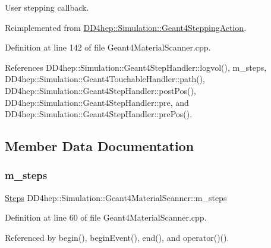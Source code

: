 User stepping callback. 



Reimplemented from \hyperlink{class_d_d4hep_1_1_simulation_1_1_geant4_stepping_action_ab6b61f6eaed6d06ddb3a7ed319258317}{D\+D4hep\+::\+Simulation\+::\+Geant4\+Stepping\+Action}.



Definition at line 142 of file Geant4\+Material\+Scanner.\+cpp.



References D\+D4hep\+::\+Simulation\+::\+Geant4\+Step\+Handler\+::logvol(), m\+\_\+steps, D\+D4hep\+::\+Simulation\+::\+Geant4\+Touchable\+Handler\+::path(), D\+D4hep\+::\+Simulation\+::\+Geant4\+Step\+Handler\+::post\+Pos(), D\+D4hep\+::\+Simulation\+::\+Geant4\+Step\+Handler\+::pre, and D\+D4hep\+::\+Simulation\+::\+Geant4\+Step\+Handler\+::pre\+Pos().



\subsection{Member Data Documentation}
\hypertarget{class_d_d4hep_1_1_simulation_1_1_geant4_material_scanner_aa8e97ed5d8812c6b4b4ceb0dce5f37d8}{}\label{class_d_d4hep_1_1_simulation_1_1_geant4_material_scanner_aa8e97ed5d8812c6b4b4ceb0dce5f37d8} 
\subsubsection{\texorpdfstring{m\+\_\+steps}{m\_steps}}
{\footnotesize\ttfamily \hyperlink{class_d_d4hep_1_1_simulation_1_1_geant4_material_scanner_af5f8938342c8e56e7db11a372b8d4d9c}{Steps} D\+D4hep\+::\+Simulation\+::\+Geant4\+Material\+Scanner\+::m\+\_\+steps\hspace{0.3cm}{\ttfamily [protected]}}



Definition at line 60 of file Geant4\+Material\+Scanner.\+cpp.



Referenced by begin(), begin\+Event(), end(), and operator()().

\hypertarget{class_d_d4hep_1_1_simulation_1_1_geant4_material_scanner_a0632ba964c16dfa195aef83134e51430}{}\label{class_d_d4hep_1_1_simulation_1_1_geant4_material_scanner_a0632ba964c16dfa195aef83134e51430} 
